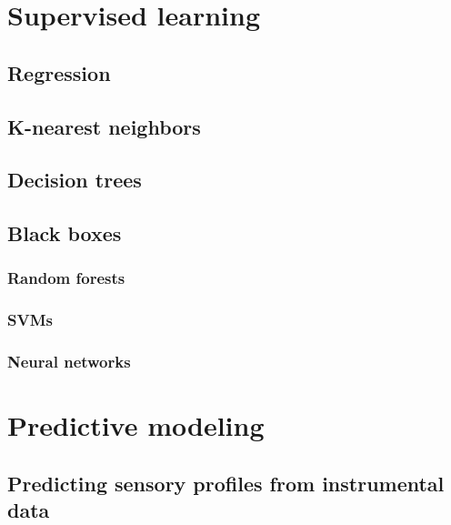 \documentclass[
]{book}
\begin{document}
\hypertarget{supervised-learning}{%
\section{Supervised learning}\label{supervised-learning}}

\hypertarget{regression}{%
\subsection{Regression}\label{regression}}

\hypertarget{k-nearest-neighbors}{%
\subsection{K-nearest neighbors}\label{k-nearest-neighbors}}

\hypertarget{decision-trees}{%
\subsection{Decision trees}\label{decision-trees}}

\hypertarget{black-boxes}{%
\subsection{Black boxes}\label{black-boxes}}

\hypertarget{random-forests}{%
\subsubsection{Random forests}\label{random-forests}}

\hypertarget{svms}{%
\subsubsection{SVMs}\label{svms}}

\hypertarget{neural-networks}{%
\subsubsection{Neural networks}\label{neural-networks}}

\hypertarget{predictive-modeling}{%
\section{Predictive modeling}\label{predictive-modeling}}

\hypertarget{predicting-sensory-profiles-from-instrumental-data}{%
\subsection{Predicting sensory profiles from instrumental data}\label{predicting-sensory-profiles-from-instrumental-data}}
\end{document}
